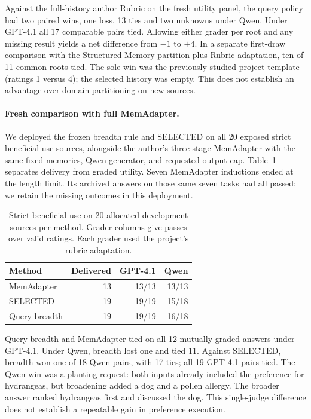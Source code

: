 \documentclass[11pt]{article}
\begin{document}
Against the full-history author Rubric on the fresh utility panel, the query policy had two paired wins, one loss, 13 ties and two unknowns under Qwen. Under GPT-4.1 all 17 comparable pairs tied. Allowing either grader per root and any missing result yields a net difference from $-1$ to $+4$. In a separate first-draw comparison with the Structured Memory partition plus Rubric adaptation, ten of 11 common roots tied. The sole win was the previously studied project template (ratings 1 versus 4); the selected history was empty. This does not establish an advantage over domain partitioning on new sources.

\paragraph{Fresh comparison with full MemAdapter.}
We deployed the frozen breadth rule and SELECTED on all 20 exposed strict beneficial-use sources, alongside the author's three-stage MemAdapter with the same fixed memories, Qwen generator, and requested output cap. Table~\ref{tab:utilityrelease} separates delivery from graded utility. Seven MemAdapter inductions ended at the length limit. Its archived answers on those same seven tasks had all passed; we retain the missing outcomes in this deployment.

\begin{table}[t]
\centering
\small
\begin{tabular}{lrrr}
\toprule
Method & Delivered & GPT-4.1 & Qwen \\
\midrule
MemAdapter & 13 & 13/13 & 13/13 \\
SELECTED & 19 & 19/19 & 15/18 \\
Query breadth & 19 & 19/19 & 16/18 \\
\bottomrule
\end{tabular}
\caption{Strict beneficial use on 20 allocated development sources per method. Grader columns give passes over valid ratings. Each grader used the project's rubric adaptation.}
\label{tab:utilityrelease}
\end{table}

Query breadth and MemAdapter tied on all 12 mutually graded answers under GPT-4.1. Under Qwen, breadth lost one and tied 11. Against SELECTED, breadth won one of 18 Qwen pairs, with 17 ties; all 19 GPT-4.1 pairs tied. The Qwen win was a planting request: both inputs already included the preference for hydrangeas, but broadening added a dog and a pollen allergy. The broader answer ranked hydrangeas first and discussed the dog. This single-judge difference does not establish a repeatable gain in preference execution.
\end{document}
